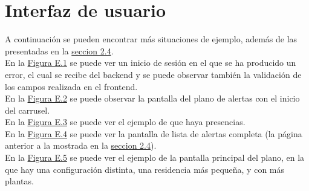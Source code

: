\chapter{Interfaz de usuario}
\label{anexo-e}

A continuación se pueden encontrar más situaciones de ejemplo, además de las presentadas en la \hyperref[section-ui]{seccion 2.4}.\\

En la \hyperref[fig:login-error]{Figura E.1} se puede ver un inicio de sesión en el que se ha producido un error, el cual se recibe del backend y se puede observar también la validación de los campos realizada en el frontend.\\

En la \hyperref[fig:map-carrusel]{Figura E.2} se puede observar la pantalla del plano de alertas con el inicio del carrusel.\\

En la \hyperref[fig:map-presencias]{Figura E.3} se puede ver el ejemplo de que haya presencias.\\

En la \hyperref[fig:list-completa]{Figura E.4} se puede ver la pantalla de lista de alertas completa (la página anterior a la mostrada en la \hyperref[section-ui]{seccion 2.4}).\\

En la \hyperref[fig:map-configuracion]{Figura E.5} se puede ver el ejemplo de la pantalla principal del plano, en la que hay una configuración distinta, una residencia más pequeña, y con más plantas.\\


